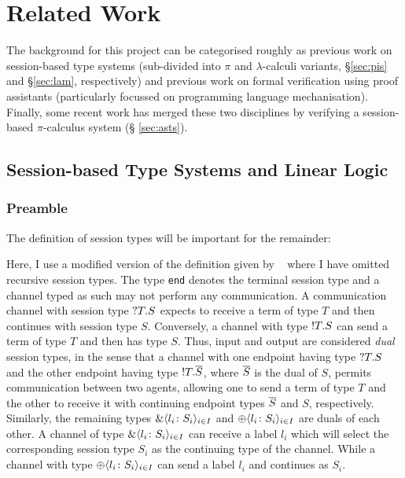 \section{Related Work}\label{sec:rw}

The background for this project can be categorised roughly as previous work on
session-based type systems (sub-divided into $\pi$ and $\lambda$-calculi
variants, \S \ref{sec:pis} and \S \ref{sec:lam}, respectively) and previous
work on formal verification using proof assistants (particularly focussed on
programming language mechanisation). Finally, some recent work has merged
these two disciplines by verifying a session-based $\pi$-calculus system (\S
\ref{sec:asts}).

\subsection{Session-based Type Systems and Linear Logic}\label{sec:sts}

\subsubsection{Preamble}\label{sec:pre}

The definition of session types will be important for the remainder:


Here, I use a modified version of the definition given by
\citeauthor{Gay:2010:LAST}~\cite{Gay:2010:LAST} where I have omitted recursive
session types. The type \lstinline{end} denotes the terminal session type and
a channel typed as such may not perform any communication. A communication
channel with session type $?{T}.{S}$ expects to receive a term of type $T$
and then continues with session type $S$. Conversely, a channel with type
$!{T}.{S}$ can send a term of type $T$ and then has type $S$. Thus, input
and output are considered \emph{dual} session types, in the sense that a
channel with one endpoint having type $?{T}.{S}$ and the other endpoint
having type $!{T}.{\overline{{S}}}$, where $\overline{{S}}$ is the dual of $S$,
permits communication between two agents, allowing one to send a term of type
$T$ and the other to receive it with continuing endpoint types $\overline{{S}}$ and
$S$, respectively. Similarly, the remaining types $\&\langle{l_i}\colon{S_i}\rangle_{i\in I}$
and $\oplus\langle{l_i}\colon{S_i}\rangle_{i\in I}$ are duals of each other. A channel of type
$\&\langle{l_i}\colon{S_i}\rangle_{i\in I}$ can receive a label $l_i$ which will select the
corresponding session type $S_i$ as the continuing type of the channel. While
a channel with type $\oplus\langle{l_i}\colon{S_i}\rangle_{i\in I}$ can send a label $l_i$ and
continues as $S_i$.

